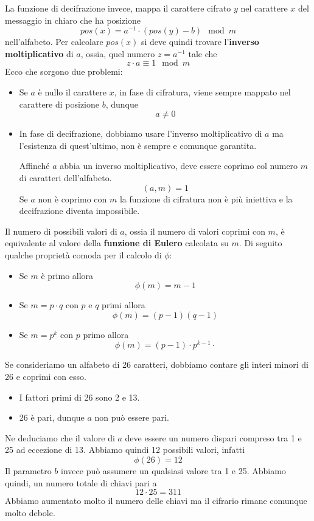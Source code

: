 La funzione di decifrazione invece, mappa il carattere cifrato $y$ nel carattere $x$ del messaggio in chiaro che ha
posizione
\[ pos(x) = a^{-1} \cdot (pos(y) - b) \mod{m} \]
nell'alfabeto. Per calcolare $pos(x)$ si deve quindi trovare l'\textbf{inverso moltiplicativo} di $a$, ossia, quel
numero $z = a^{-1}$ tale che
\[ z \cdot a \equiv 1 \mod{m} \]
Ecco che sorgono due problemi:
\begin{itemize}
	\item Se $a$ \`e nullo il carattere $x$, in fase di cifratura, viene sempre mappato nel carattere di posizione $b$,
	      dunque
	      \[ a \neq 0 \]
	\item In fase di decifrazione, dobbiamo usare l'inverso moltiplicativo di $a$ ma l'esistenza di quest'ultimo, non
	      \`e sempre e comunque garantita.

	      Affinch\'e $a$ abbia un inverso moltiplicativo, deve essere coprimo col numero $m$ di caratteri dell'alfabeto.
	      \[ (a, m) = 1 \]
	      Se $a$ non \`e coprimo con $m$ la funzione di cifratura non \`e pi\`u iniettiva e la decifrazione
	      diventa impossibile.
\end{itemize}
Il numero di possibili valori di $a$, ossia il numero di valori coprimi con $m$, \`e equivalente al valore della
\textbf{funzione di Eulero} calcolata su $m$. Di seguito qualche propriet\`a comoda per il calcolo di $\phi$:
\begin{itemize}
	\item Se $m$ \`e primo allora
	      \[ \phi(m) = m - 1 \]
	\item Se $m = p \cdot q$ con $p$ e $q$ primi allora
	      \[ \phi(m) = (p - 1)(q - 1) \]
	\item Se $m = p^{k}$ con $p$ primo allora
	      \[ \phi(m) = (p - 1) \cdot p^{k-1} \cdot  \]
\end{itemize}

Se consideriamo un alfabeto di 26 caratteri, dobbiamo contare gli interi minori di 26 e coprimi con esso.
\begin{itemize}
	\item I fattori primi di 26 sono 2 e 13.
	\item 26 \`e pari, dunque $a$ non pu\`o essere pari.
\end{itemize}
Ne deduciamo che il valore di $a$ deve essere un numero dispari compreso tra 1 e 25 ad eccezione di 13. Abbiamo quindi
12 possibili valori, infatti
\[ \phi(26) = 12 \]
Il parametro $b$ invece pu\`o assumere un qualsiasi valore tra 1 e 25. Abbiamo quindi, un numero totale di chiavi pari a
\[ 12 \cdot 25 = 311 \]
Abbiamo aumentato molto il numero delle chiavi ma il cifrario rimane comunque molto debole.

